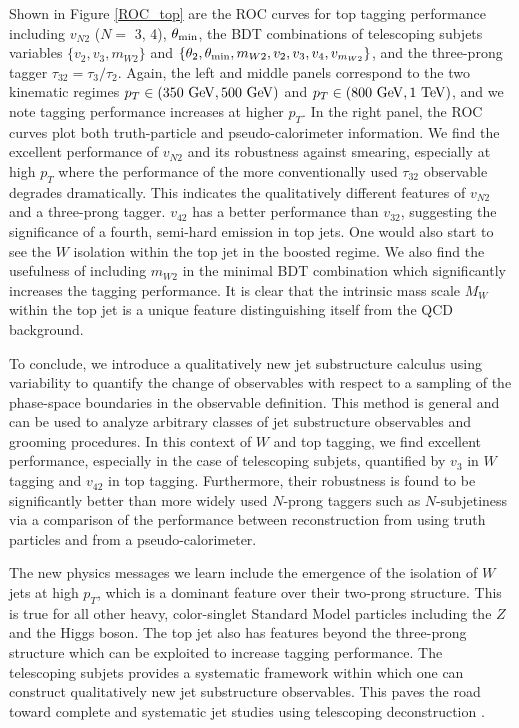 \documentclass[aps,prl,floatfix,preprintnumbers,twocolumn,groupedaddress,nofootinbib]{revtex4-1}
\begin{document}
Shown in Figure \ref{ROC_top} are the ROC curves for top tagging performance including $v_{N2}$ ($N = $ 3, 4), $\theta_{\rm min}$, the BDT combinations of telescoping subjets variables $\{v_2, v_3, m_{W2}\}$ and $\{\theta_2,\theta_{\rm min},m_{W2},v_2,v_3,v_4,v_{m_{W2}}\}$, and the three-prong tagger $\tau_{32}=\tau_{3}/\tau_{2}$. Again, the left and middle panels correspond to the two kinematic regimes $p_T \in (350~{\rm GeV}, 500~{\rm GeV})$ and $p_T \in (800~{\rm GeV}, 1~{\rm TeV})$, and we note tagging performance increases at higher $p_T$. In the right panel, the ROC curves plot both truth-particle and pseudo-calorimeter information. We find the excellent performance of $v_{N2}$ and its robustness against smearing, especially at high $p_T$ where the performance of the more conventionally used $\tau_{32}$ observable degrades dramatically. This indicates the qualitatively different features of $v_{N2}$ and a three-prong tagger. $v_{42}$ has a better performance than $v_{32}$, suggesting the significance of a fourth, semi-hard emission in top jets. One would also start to see the $W$ isolation within the top jet in the boosted regime. We also find the usefulness of including $m_{W2}$ in the minimal BDT combination which significantly increases the tagging performance. It is clear that the intrinsic mass scale $M_W$ within the top jet is a unique feature distinguishing itself from the QCD background.

To conclude, we introduce a qualitatively new jet substructure calculus using variability to quantify the change of observables with respect to a sampling of the phase-space boundaries in the observable definition. This method is general and can be used to analyze arbitrary classes of jet substructure observables and grooming procedures. In this context of $W$ and top tagging, we find excellent performance, especially in the case of telescoping subjets, quantified by $v_3$ in $W$ tagging and $v_{42}$ in top tagging. Furthermore, their robustness is found to be significantly better than more widely used $N$-prong taggers such as $N$-subjetiness via a comparison of the performance between reconstruction from using truth particles and from a pseudo-calorimeter.

The new physics messages we learn include the emergence of the isolation of $W$ jets at high $p_T$, which is a dominant feature over their two-prong structure. This is true for all other heavy, color-singlet Standard Model particles including the $Z$ and the Higgs boson. The top jet also has features beyond the three-prong structure which can be exploited to increase tagging performance. The telescoping subjets provides a systematic framework within which one can construct qualitatively new jet substructure observables. This paves the road toward complete and systematic jet studies using telescoping deconstruction \cite{Chien:2017decon}.
\end{document}
